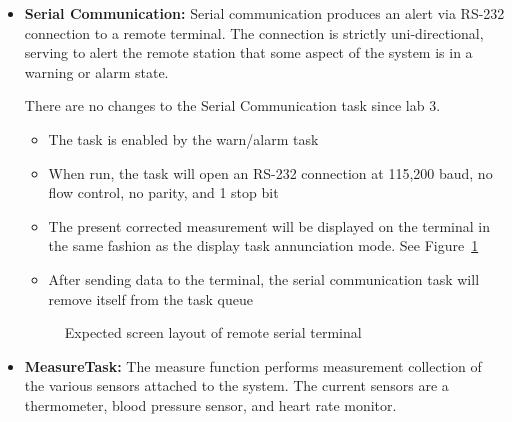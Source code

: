 \documentclass[12pt]{article} %
\begin{document}
\begin{itemize}
	\item \textbf{Serial Communication:}
		Serial communication produces an alert via RS-232 connection to a remote
		terminal. The connection is strictly uni-directional, serving to alert the
		remote station that some aspect of the system is in a warning or alarm
		state.

		There are no changes to the Serial Communication task since lab 3.
    \begin{itemize}
      \item The task is enabled by the warn/alarm task
      \item When run, the task will open an RS-232 connection at 115,200 baud,
          no flow control, no parity, and 1 stop bit
      \item The present corrected measurement will be displayed on the terminal
				in the same fashion as the display task annunciation mode. See Figure~\ref{fig:serial_display}
      \item After sending data to the terminal, the serial communication task
	will remove itself from the task queue
    \end{itemize}

		\begin{figure}[h]
			\centering
			\caption{Expected screen layout of remote serial terminal}
			\label{fig:serial_display}
		\end{figure}

	\item \textbf{MeasureTask:}
		The measure function performs measurement collection of the various sensors
		attached to the system. The current sensors are a thermometer, blood
		pressure sensor, and heart rate monitor.
		

\end{itemize}
\end{document}
